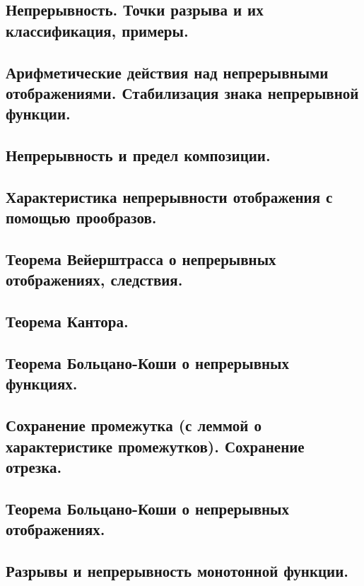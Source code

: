 \documentclass[12pt, a4paper]{article}
\begin{document}
\subsection{Непрерывность. Точки разрыва и их классификация, примеры.}

\subsection{Арифметические действия над непрерывными отображениями. Стабилизация знака непрерывной функции.}

\subsection{Непрерывность и предел композиции.}

\subsection{Характеристика непрерывности отображения с помощью прообразов.}

\subsection{Теорема Вейерштрасса о непрерывных отображениях, следствия.}

\subsection{Теорема Кантора.}

\subsection{Теорема Больцано-Коши о непрерывных функциях.}

\subsection{Сохранение промежутка (с леммой о характеристике промежутков). Сохранение отрезка.}

\subsection{Теорема Больцано-Коши о непрерывных отображениях.}

\subsection{Разрывы и непрерывность монотонной функции.}
\end{document}

